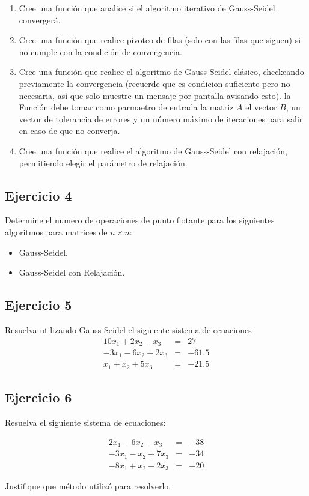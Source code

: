 \documentclass[a4paper,11pt]{article}
\theoremstyle{mytheor}
\begin{document}
\begin{enumerate}[label=\Roman*]

\item Cree una función que analice si el algoritmo iterativo de Gauss-Seidel convergerá.

\item Cree una función que realice pivoteo de filas (solo con las filas que siguen) si no cumple con la condición de convergencia.

\item Cree una función que realice el algoritmo de Gauss-Seidel clásico, checkeando previamente la convergencia (recuerde que es condicion suficiente pero no necesaria, así que solo muestre un mensaje por pantalla avisando esto). la Función debe tomar como parmaetro de entrada la matriz $A$ el vector $B$, un vector de tolerancia de errores y un número máximo de iteraciones para salir en caso de que no converja. 

\item Cree una función que realice el algoritmo de Gauss-Seidel con relajación, permitiendo elegir el parámetro de relajación.
 
\end{enumerate}


\subsection*{Ejercicio 4}

Determine el numero de operaciones de punto flotante para los siguientes algoritmos para matrices de $n\times	n$:
\begin{itemize}
\item Gauss-Seidel.
\item Gauss-Seidel con Relajación.
\end{itemize}

\subsection*{Ejercicio 5}


Resuelva utilizando Gauss-Seidel el siguiente sistema de ecuaciones 
$$\begin{array}{ccc}
10x_1 +2x_2 - x_3 	&=& 27\\
-3x_1 -6x_2 + 2x_3 	&=& -61.5\\
x_1+x_2+ 5x_3 		&=& -21.5
\end{array}$$

\subsection*{Ejercicio 6}

Resuelva el siguiente sistema de ecuaciones:

$$\begin{array}{ccc}
2x_1 -6x_2 -x_3 &=& -38\\
-3x_1-x_2+7x_3 &=& -34\\
-8x_1 +x_2-2x_3 &=& -20
\end{array}$$

Justifique que método utilizó para resolverlo.
\end{document}
